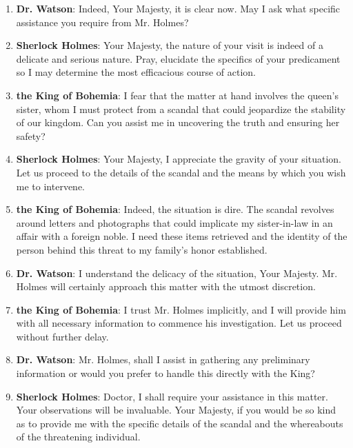 \documentclass[10pt]{article}
\begin{document}
\begin{enumerate}\setlength{\itemsep}{1pt}\small

\item \textbf{Dr. Watson}: Indeed, Your Majesty, it is clear now. May I ask what specific assistance you require from Mr. Holmes?

\item \textbf{Sherlock Holmes}: Your Majesty, the nature of your visit is indeed of a delicate and serious nature. Pray, elucidate the specifics of your predicament so I may determine the most efficacious course of action.

\item \textbf{the King of Bohemia}: I fear that the matter at hand involves the queen's sister, whom I must protect from a scandal that could jeopardize the stability of our kingdom. Can you assist me in uncovering the truth and ensuring her safety?

\item \textbf{Sherlock Holmes}: Your Majesty, I appreciate the gravity of your situation. Let us proceed to the details of the scandal and the means by which you wish me to intervene.

\item \textbf{the King of Bohemia}: Indeed, the situation is dire. The scandal revolves around letters and photographs that could implicate my sister-in-law in an affair with a foreign noble. I need these items retrieved and the identity of the person behind this threat to my family's honor established.

\item \textbf{Dr. Watson}: I understand the delicacy of the situation, Your Majesty. Mr. Holmes will certainly approach this matter with the utmost discretion.

\item \textbf{the King of Bohemia}: I trust Mr. Holmes implicitly, and I will provide him with all necessary information to commence his investigation. Let us proceed without further delay.

\item \textbf{Dr. Watson}: Mr. Holmes, shall I assist in gathering any preliminary information or would you prefer to handle this directly with the King?

\item \textbf{Sherlock Holmes}: Doctor, I shall require your assistance in this matter. Your observations will be invaluable. Your Majesty, if you would be so kind as to provide me with the specific details of the scandal and the whereabouts of the threatening individual.


\end{enumerate}
\end{document}
